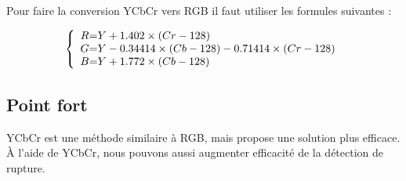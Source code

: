 Pour faire la conversion YCbCr vers RGB il faut utiliser les formules suivantes :

\[
 \left \{
 \begin{array}{c @{=} l}
	R & Y + 1.402 \times (Cr - 128) \\
	G & Y - 0.34414 \times (Cb - 128) - 0.71414 \times (Cr - 128) \\
	B & Y + 1.772 \times (Cb - 128) \\
 \end{array}
 \right.
\]


\subsection{Point fort}
YCbCr est une méthode similaire à RGB, mais propose une solution plus efficace. À l’aide de YCbCr, nous pouvons aussi augmenter efficacité de la détection de rupture.

